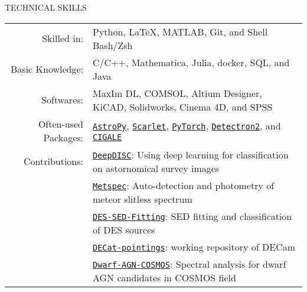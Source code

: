 \documentclass[11pt]{article}
\begin{document}
\begin{section}{TECHNICAL SKILLS}

\begin{tabular}{rl}
    Skilled in: & Python, \LaTeX, MATLAB, Git, and Shell Bash/Zsh \\
    Basic Knowledge: & C/C++, Mathematica, Julia, docker, SQL, and Java \\
    Softwares: & MaxIm DL, COMSOL, Altium Designer, KiCAD, Solidworks, Cinema 4D, and SPSS \\
    Often-used Packages: & \href{https://www.astropy.org/}{\texttt{AstroPy}}, \href{https://github.com/pmelchior/scarlet}{\texttt{Scarlet}}, \href{https://pytorch.org/}{\texttt{PyTorch}}, \href{https://github.com/facebookresearch/detectron2}{\texttt{Detectron2}}, and \href{https://cigale.lam.fr/}{\texttt{CIGALE}} \\
    Contributions: & \href{https://github.com/burke86/deepdisc}{\texttt{DeepDISC}}: Using deep learning for classification on astornomical survey images \\
    & \href{https://github.com/Chisen-Lupus/metspec}{\texttt{Metspec}}: Auto-detection and photometry of meteor slitless spectrum \\
    & \href{https://github.com/Chisen-Lupus/DES-SED-fitting}{\texttt{DES-SED-Fitting}}: SED fitting and classification of DES sources \\
    & \href{https://github.com/gnarayan/decat_pointings}{\texttt{DECat-pointings}}: working repository of DECam \\
    & \href{https://github.com/burke86/dwarf_agn_cosmos}{\texttt{Dwarf-AGN-COSMOS}}: Spectral analysis for dwarf AGN candidates in COSMOS field
\end{tabular}

\end{section} 
\end{document}
